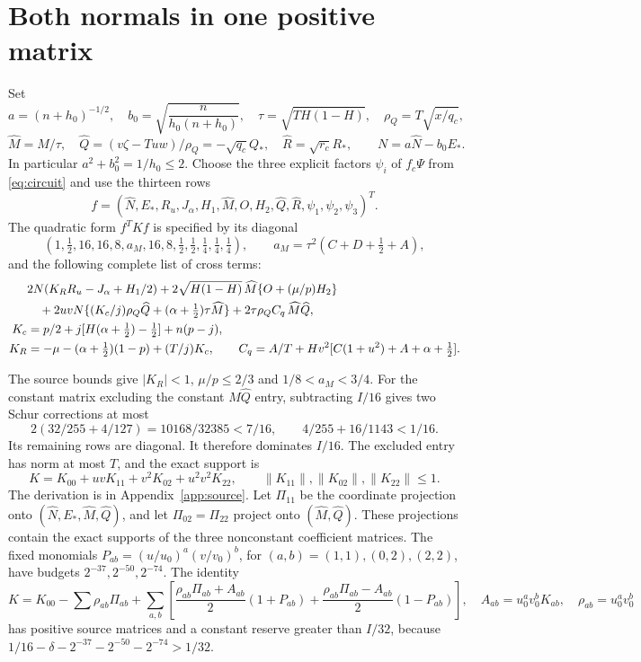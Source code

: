 \documentclass[10pt]{article}
\newcommand{\half}{\tfrac12}
\newcommand{\Qh}{Q_*}
\newcommand{\Rh}{R_*}
\newcommand{\Ps}{\Psi}
\begin{document}
\section{Both normals in one positive matrix}
Set
\[
 a=(n+h_0)^{-1/2},\quad
 b_0=\sqrt{\frac{n}{h_0(n+h_0)}},\quad
 \tau=\sqrt{TH(1-H)},\quad \rho_Q=T\sqrt{x/q_c},
\]
\[
 \widehat M=M/\tau,\quad
 \widehat Q=(v\zeta-Tuw)/\rho_Q=-\sqrt{q_c}\Qh,\quad
 \widehat R=\sqrt{r_c}\Rh,\qquad N=a\widehat N-b_0E_*.
\]
In particular $a^2+b_0^2=1/h_0\leq2$. Choose the three explicit factors
$\psi_i$ of $f_c\Ps$ from \eqref{eq:circuit} and use the thirteen rows
\[
 f=(\widehat N,E_*,R_u,J_\alpha,H_1,\widehat M,O,H_2,
                         \widehat Q,\widehat R,\psi_1,\psi_2,\psi_3)^T.
\]
The quadratic form $f^TKf$ is specified by its diagonal
\begin{equation}
 (1,\half,16,16,8,a_M,16,8,\half,\half,\tfrac14,\tfrac14,\tfrac14),
 \qquad a_M=\tau^2(C+D+\half+A),
 \label{eq:diag}
\end{equation}
and the following complete list of cross terms:
\begin{align}
 &2N(K_RR_u-J_\alpha+H_1/2)
 +2\sqrt{H(1-H)}\,\widehat M\{O+(\mu/p)H_2\}\notag\\
 &\quad+2uvN\{(K_c/j)\rho_Q\widehat Q
                         +(\alpha+\half)\tau\widehat M\}
 +2\tau\rho_Q C_q\,\widehat M\widehat Q, \label{eq:cross}\\
 K_c&=p/2+j[H(\alpha+\half)-\half]+n(p-j),\notag\\
 K_R&=-\mu-(\alpha+\half)(1-p)+(T/j)K_c,\qquad
 C_q=A/T+Hv^2[C(1+u^2)+A+\alpha+\half].\notag
\end{align}

The source bounds give $|K_R|<1$, $\mu/p\leq2/3$ and $1/8<a_M<3/4$.
For the constant matrix excluding the constant $\widehat M\widehat Q$
entry, subtracting $I/16$ gives two Schur corrections at most
\[
 2(32/255+4/127)=10168/32385<7/16,\qquad
 4/255+16/1143<1/16 .
\]
Its remaining rows are diagonal. It therefore dominates $I/16$.
The excluded entry has norm at most $T$, and the exact support is
\begin{equation}
 K=K_{00}+uvK_{11}+v^2K_{02}+u^2v^2K_{22},\qquad
 \|K_{11}\|,\|K_{02}\|,\|K_{22}\|\leq1.
 \label{eq:Kbounds}
\end{equation}
The derivation is in Appendix~\ref{app:source}.
Let $\Pi_{11}$ be the coordinate projection onto
$(\widehat N,E_*,\widehat M,\widehat Q)$, and let
$\Pi_{02}=\Pi_{22}$ project onto $(\widehat M,\widehat Q)$.
These projections contain the exact supports of the three nonconstant
coefficient matrices. The fixed monomials $P_{ab}=(u/u_0)^a(v/v_0)^b$, for
$(a,b)=(1,1),(0,2),(2,2)$, have budgets
$2^{-37},2^{-50},2^{-74}$. The identity
\[
 K=K_{00}-\sum\rho_{ab}\Pi_{ab}+
 \sum_{a,b}\left[
 \frac{\rho_{ab}\Pi_{ab}+A_{ab}}2(1+P_{ab})+
 \frac{\rho_{ab}\Pi_{ab}-A_{ab}}2(1-P_{ab})\right],
 \quad A_{ab}=u_0^av_0^bK_{ab},\quad\rho_{ab}=u_0^av_0^b
\]
has positive source matrices and a constant reserve greater than $I/32$,
because $1/16-\delta-2^{-37}-2^{-50}-2^{-74}>1/32$.
\end{document}

